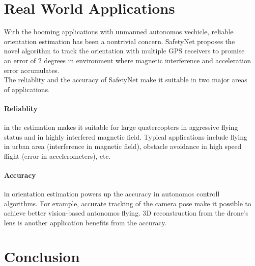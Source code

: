 \documentclass[journal,onecolumn]{IEEEtran}
\begin{document}
\section{Real World Applications}
With the booming applications with unmanned autonomos vechicle, reliable orientation
estimation has been a nontrivial concern. SafetyNet proposes the novel algorithm
to track the orientation with multiple GPS receivers to promise an error of 2 degrees
in environment where magnetic interference and acceleration error accumulates.\\
The reliablity and the accuracy of SafetyNet make it suitable in two major areas of
applications.\\
\paragraph{Reliablity} in the estimation makes it suitable for large quatercopters in aggressive
flying status and in highly interfered magnetic field. Typical applications include
flying in urban area (interference in magnetic field), obstacle avoidance in high
speed flight (error in accelerometers), etc. \\
\paragraph{Accuracy} in orientation estimation powers up the accuracy in
autonomos controll algorithms. For example, accurate tracking of the camera pose make it possible
to achieve better vision-based antonomos flying. 3D reconstruction from the drone's
lens is another application benefits from the accuracy.

\section{Conclusion}
\end{document}
